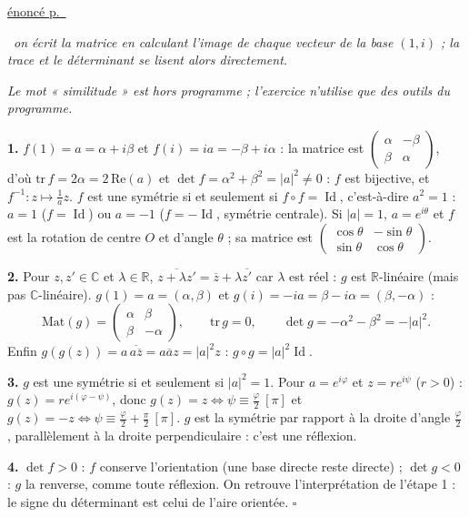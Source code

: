 \documentclass[a4paper,11pt]{article}
\numberwithin{equation}{section}
\numberwithin{figure}{section}
\numberwithin{table}{section}
\theoremstyle{enonce}
\theoremstyle{exemple}
\theoremstyle{remarque}
\newenvironment{corrige}[1]{%
  \par\needspace{6\baselineskip}\vspace{1em}\phantomsection\label{c:#1}%
  \noindent{\sffamily\bfseries\color{Bleu}Exercice~\ref{e:#1}}\quad
  {\scriptsize\sffamily\hyperref[e:#1]{\color{Gris}énoncé p.~\pageref{e:#1}}}\par\nobreak\vspace{0.2em}}%
  {\hfill\textcolor{BleuClair}{$\square$}\par}
\newcommand{\R}{\mathbb{R}}
\newcommand{\C}{\mathbb{C}}
\newcommand{\Id}{\operatorname{Id}}
\newcommand{\demarche}[1]{\noindent{\sffamily\bfseries\small\color{BleuMoyen}Démarche.}\ \textit{#1}\par\smallskip}
\begin{document}
\begin{corrige}{g-simil}
\demarche{on écrit la matrice en calculant l'image de chaque vecteur de la base $(1,i)$ ; la trace et le déterminant se lisent alors directement.}
\emph{Le mot « similitude » est hors programme ; l'exercice n'utilise que des outils du programme.}

\textbf{1.} $f(1)=a=\alpha+i\beta$ et $f(i)=ia=-\beta+i\alpha$ : la matrice est
$\begin{pmatrix}\alpha&-\beta\\\beta&\alpha\end{pmatrix}$, d'où $\mathrm{tr}\,f=2\alpha=2\,\mathrm{Re}(a)$ et
$\det f=\alpha^2+\beta^2=|a|^2\neq0$ : $f$ est bijective, et $f^{-1}:z\mapsto\frac1az$. $f$ est une symétrie si et
seulement si $f\circ f=\Id$, c'est-à-dire $a^2=1$ : $a=1$ ($f=\Id$) ou $a=-1$ ($f=-\Id$, symétrie centrale). Si $|a|=1$,
$a=e^{i\theta}$ et $f$ est la rotation de centre $O$ et d'angle $\theta$ ; sa matrice est
$\begin{pmatrix}\cos\theta&-\sin\theta\\\sin\theta&\cos\theta\end{pmatrix}$.

\textbf{2.} Pour $z,z'\in\C$ et $\lambda\in\R$, $\overline{z+\lambda z'}=\overline z+\lambda\overline{z'}$ car $\lambda$ est
réel : $g$ est $\R$-linéaire (mais pas $\C$-linéaire). $g(1)=a=(\alpha,\beta)$ et $g(i)=-ia=\beta-i\alpha=(\beta,-\alpha)$ :
\[\mathrm{Mat}(g)=\begin{pmatrix}\alpha&\beta\\\beta&-\alpha\end{pmatrix},\qquad\mathrm{tr}\,g=0,\qquad
\det g=-\alpha^2-\beta^2=-|a|^2.\]
Enfin $g(g(z))=a\,\overline{a\overline z}=a\overline a z=|a|^2z$ : $g\circ g=|a|^2\Id$.

\textbf{3.} $g$ est une symétrie si et seulement si $|a|^2=1$. Pour $a=e^{i\varphi}$ et $z=re^{i\psi}$ ($r>0$) :
$g(z)=re^{i(\varphi-\psi)}$, donc $g(z)=z\iff\psi\equiv\frac\varphi2\ [\pi]$ et $g(z)=-z\iff\psi\equiv\frac\varphi2+\frac\pi2\ [\pi]$.
$g$ est la symétrie par rapport à la droite d'angle $\frac\varphi2$, parallèlement à la droite perpendiculaire : c'est une
réflexion.

\textbf{4.} $\det f>0$ : $f$ conserve l'orientation (une base directe reste directe) ; $\det g<0$ : $g$ la renverse,
comme toute réflexion. On retrouve l'interprétation de l'étape 1 : le signe du déterminant est celui de l'aire orientée.
\end{corrige}
\end{document}
